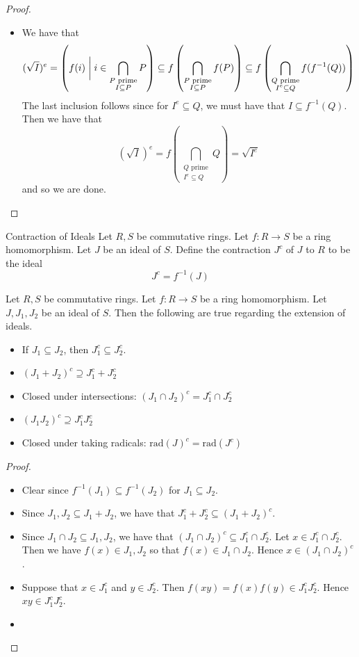 \documentclass[a4paper]{article}
\begin{document}
\begin{prp}{}{}
\begin{proof}
\begin{itemize}
\item We have that $$
(\sqrt{I})^e=\left(f(i)\;\bigg{|}\;i\in\bigcap_{\substack{P\text{ prime}\\I\subseteq P}}P\right)\subseteq f\left(\bigcap_{\substack{P\text{ prime}\\I\subseteq P}}f(P)\right)\subseteq f\left(\bigcap_{\substack{Q\text{ prime}\\I^e\subseteq Q}}f(f^{-1}(Q))\right)$$ The last inclusion follows since for $I^e\subseteq Q$, we must have that $I\subseteq f^{-1}(Q)$. Then we have that $$(\sqrt{I})^e=f\left(\bigcap_{\substack{Q\text{ prime}\\I^e\subseteq Q}}Q\right)=\sqrt{I^e}$$ and so we are done. 
\end{itemize}
\end{proof}
\end{prp}

\begin{defn}{Contraction of Ideals}{} Let $R,S$ be commutative rings. Let $f:R\to S$ be a ring homomorphism. Let $J$ be an ideal of $S$. Define the contraction $J^c$ of $J$ to $R$ to be the ideal $$J^c=f^{-1}(J)$$
\end{defn}

\begin{prp}{}{} Let $R,S$ be commutative rings. Let $f:R\to S$ be a ring homomorphism. Let $J,J_1,J_2$ be an ideal of $S$. Then the following are true regarding the extension of ideals. 
\begin{itemize}
\item If $J_1\subseteq J_2$, then $J_1^c\subseteq J_2^c$. 
\item $(J_1+J_2)^c\supseteq J_1^c+J_2^c$
\item Closed under intersections: $(J_1\cap J_2)^c=J_1^c\cap J_2^c$
\item $(J_1J_2)^c\supseteq J_1^cJ_2^c$
\item Closed under taking radicals: $\text{rad}(J)^c=\text{rad}(J^c)$
\end{itemize} 
\begin{proof}\\
\begin{itemize}
\item Clear since $f^{-1}(J_1)\subseteq f^{-1}(J_2)$ for $J_1\subseteq J_2$. 
\item Since $J_1,J_2\subseteq J_1+J_2$, we have that $J_1^c+J_2^c\subseteq(J_1+J_2)^c$. 
\item Since $J_1\cap J_2\subseteq J_1,J_2$, we have that $(J_1\cap J_2)^c\subseteq J_1^c\cap J_2^c$. Let $x\in J_1^c\cap J_2^c$. Then we have $f(x)\in J_1,J_2$ so that $f(x)\in J_1\cap J_2$. Hence $x\in(J_1\cap J_2)^c$. 
\item Suppose that $x\in J_1^c$ and $y\in J_2^c$. Then $f(xy)=f(x)f(y)\in J_1^cJ_2^c$. Hence $xy\in J_1^cJ_2^c$. 
\item 
\end{itemize}
\end{proof}
\end{prp}
\end{document}

